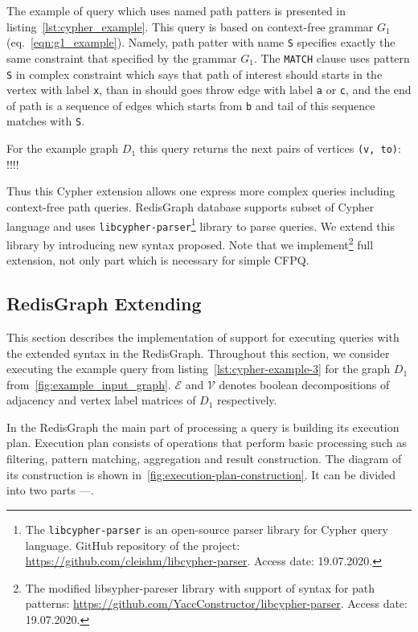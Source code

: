The example of query which uses named path patters is presented in listing~\ref{lst:cypher_example}. 
This query is based on context-free grammar $G_1$ (eq.~\ref{eqn:g1_example}). 
Namely, path patter with name \texttt{S} specifies exactly the same constraint that specified by the grammar $G_1$. 
The \texttt{MATCH} clause uses pattern \texttt{S} in complex constraint which says that path of interest should starts in the vertex with label \texttt{x}, than in should goes throw edge with label \texttt{a} or \texttt{c}, and the end of path is a sequence of edges which starts from \texttt{b} and tail of this sequence matches with \texttt{S}.  

For the example graph $D_1$ this query returns the next pairs of vertices \texttt{(v, to)}: !!!!

Thus this Cypher extension allows one express more complex queries including context-free path queries.
RedisGraph database supports subset of Cypher language and uses \texttt{libcypher-parser}\footnote{The \texttt{libcypher-parser} is an open-source parser library for Cypher query language. GitHub repository of the project: \url{https://github.com/cleishm/libcypher-parser}. Access date: 19.07.2020.} library to parse queries.
We extend this library by introducing new syntax proposed.
Note that we implement\footnote{The modified libsypher-pareser library with support of syntax for path patterns: \url{https://github.com/YaccConstructor/libcypher-parser}. Access date: 19.07.2020.} full extension, not only part which is necessary for simple CFPQ. 

\subsection{RedisGraph Extending}

This section describes the implementation of support for executing queries with the extended syntax in the RedisGraph. Throughout this section, we consider executing the example query from listing~\autoref{lst:cypher-example-3} for the graph $D_1$ from~\autoref{fig:example_input_graph}. $\mathcal{E}$ and $\mathcal{V}$ denotes boolean decompositions of adjacency and vertex label matrices of $D_1$ respectively. 

In the RedisGraph the main part of processing a query is building its execution plan. Execution plan consists of operations that perform basic processing such as filtering, pattern matching, aggregation and result construction. The diagram of its construction is shown in~\autoref{fig:execution-plan-construction}. It can be divided into two parts ---.

